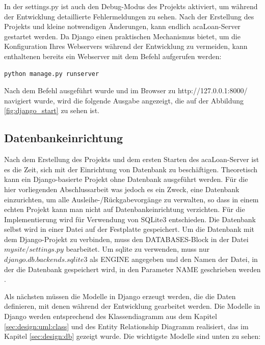 In der settings.py ist auch den Debug-Modus des Projekts aktiviert, um während der Entwicklung detaillierte Fehlermeldungen zu sehen.  Nach der Erstellung des Projekts und kleine notwendigen Änderungen, kann endlich acaLoan-Server gestartet werden. Da Django einen praktischen Mechanismus bietet, um die Konfiguration Ihres Webservers während der Entwicklung zu vermeiden, kann enthaltenen bereits ein Webserver mit dem Befehl aufgerufen werden: 
\begin{lstlisting}[caption={[runserver-Befehl] },captionpos=b]
python manage.py runserver
\end{lstlisting}
Nach dem Befehl ausgeführt wurde und im Browser zu http://127.0.0.1:8000/ navigiert wurde, wird die folgende Ausgabe angezeigt, die auf der Abbildung \ref{fig:django_start} zu sehen ist.
 
\subsection{Datenbankeinrichtung}
\label{sec:server:database}
Nach dem Erstellung des Projekts und dem ersten Starten des acaLoan-Server ist es die Zeit, sich mit der Einrichtung von Datenbank zu beschäftigen. Theoretisch kann ein Django-basierte Projekt ohne Datenbank ausgeführt werden. Für die hier vorliegenden Abschlussarbeit was jedoch es ein Zweck, eine Datenbank einzurichten, um alle Ausleihe-/Rückgabevorgänge zu verwalten, so dass in einem echten Projekt kann man nicht auf Datenbankeinrichtung verzichten. Für die Implementierung wird für Verwendung von SQLite3 entschieden. Die Datenbank selbst wird in einer Datei auf der Festplatte gespeichert. Um die Datenbank mit dem Django-Projekt zu verbinden, muss den DATABASES-Block in der Datei $mysite/settings.py$ bearbeitet. Um sqlite zu verwenden, muss nur $django.db.backends.sqlite3$ als ENGINE angegeben und den Namen der Datei, in der die Datenbank gespeichert wird, in den Parameter NAME geschrieben werden \cite{website:15}.

Als nächsten müssen die Modelle in Django erzeugt werden, die die Daten definieren, mit denen während der Entwicklung gearbeitet werden. Die Modelle in Django werden entsprechend des Klassendiagramm aus dem Kapitel \ref{sec:design:uml:class} und des Entity Relationship Diagramm realisiert, das im Kapitel \ref{sec:design:db} gezeigt wurde. Die wichtigste Modelle sind unten zu sehen:

